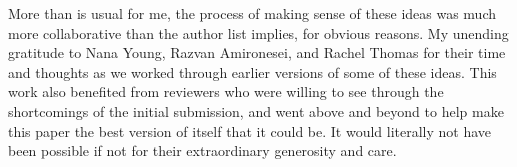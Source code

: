 \documentclass[manuscript,screen]{acmart}
\begin{document}
\begin{acks}
{More than is usual for me, the process of making sense of these ideas was much more collaborative than the author list implies, for obvious reasons. My unending gratitude to Nana Young, Razvan Amironesei, and Rachel Thomas for their time and thoughts as we worked through earlier versions of some of these ideas. This work also benefited from reviewers who were willing to see through the shortcomings of the initial submission, and went above and beyond to help make this paper the best version of itself that it could be. It would literally not have been possible if not for their extraordinary generosity and care.}
\end{acks}






\end{document}

